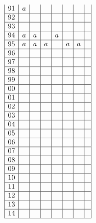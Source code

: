 \documentclass[a4j]{jarticle}
\begin{document}
\begin{align*}
\begin{array}{|c|c|c|c|c|c|c|c|}
          91&a&&&&&& \\ \hline
          92&&&&&&& \\ \hline
          93&&&&&&& \\ \hline
          94&a&a&&a&&& \\ \hline
          95&a&a&a&&a&a& \\ \hline
          96&&&&&&& \\ \hline
          97&&&&&&& \\ \hline
          98&&&&&&& \\ \hline
          99&&&&&&& \\ \hline
          00&&&&&&& \\ \hline
          01&&&&&&& \\ \hline
          02&&&&&&& \\ \hline
          03&&&&&&& \\ \hline
          04&&&&&&& \\ \hline
          05&&&&&&& \\ \hline
          06&&&&&&& \\ \hline
          07&&&&&&& \\ \hline
          08&&&&&&& \\ \hline
          09&&&&&&& \\ \hline
          10&&&&&&& \\ \hline
          11&&&&&&& \\ \hline
          12&&&&&&& \\ \hline
          13&&&&&&& \\ \hline
          14&&&&&&& \\ \hline
          \end{array}
     \end{align*}
\end{document}
